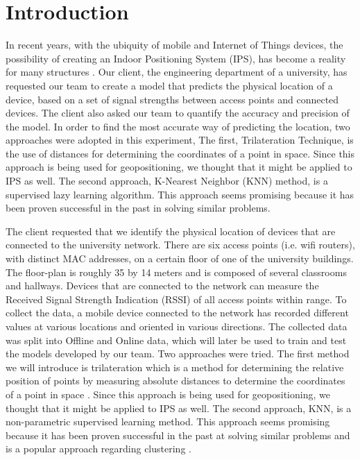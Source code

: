 \documentclass[12pt, conference]{IEEEtran}
\begin{document}
\section{Introduction}
In recent years, with the ubiquity of mobile and Internet of Things devices, the possibility of creating an Indoor Positioning System (IPS), has become a reality for many structures \cite{b1}. Our client, the engineering department of a university, has requested our team to create a model that predicts the physical location of a device, based on a set of signal strengths between access points and connected devices. The client also asked our team to quantify the accuracy and precision of the model. In order to find the most accurate way of predicting the location, two approaches were adopted in this experiment, The first, Trilateration Technique, is the use of distances for determining the coordinates of a point in space. Since this approach is being used for geopositioning, we thought that it might be applied to IPS as well. The second approach, K-Nearest Neighbor (KNN) method, is a supervised lazy learning algorithm. This approach seems promising because it has been proven successful in the past in solving similar problems.

The client requested that we identify the physical location of devices that are connected to the university network. There are six access points (i.e. wifi routers), with distinct MAC addresses, on a certain floor of one of the university buildings. The floor-plan is roughly 35 by 14 meters and is composed of several classrooms and hallways. Devices that are connected to the network can measure the Received Signal Strength Indication (RSSI) of all access points within range. To collect the data, a mobile device connected to the network has recorded different values at various locations and oriented in various directions. The collected data was split into Offline and Online data, which will later be used to train and test the models developed by our team.
Two approaches were tried. The first method we will introduce is trilateration which is a method for determining the relative position of points by measuring absolute distances to determine the coordinates of a point in space \cite{b2}. Since this approach is being used for geopositioning, we thought that it might be applied to IPS as well. The second approach, KNN, is a non-parametric supervised learning method. This approach seems promising because it has been proven successful in the past at solving similar problems and is a popular approach regarding clustering \cite{b3}.
\end{document}
